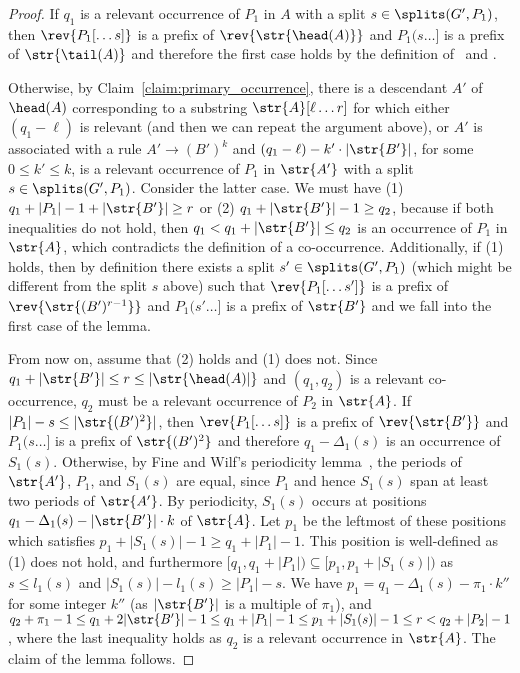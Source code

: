 \begin{proof}
If $q_1$ is a relevant occurrence of $P_1$ in $A$ with a split $s \in \splits(G', P_1)$, then $\rev{P_1[\dots s]}$ is a prefix of $\rev{\str{\head(A)}}$ and $P_1(s \dots ]$ is a prefix of $\str{\tail(A)}$ and therefore the first case holds by the definition of \Tpre\ and \Tsuf. 

Otherwise, by Claim~\ref{claim:primary_occurrence}, there is a descendant $A'$ of $\head(A)$ corresponding to a substring $\str{A}[\ell \dots r]$ for which either $(q_1-\ell)$ is relevant (and then we can repeat the argument above), or $A'$ is associated with a rule $A' \rightarrow (B')^k$ and $(q_1-\ell)-k' \cdot |\str{B'}|$, for some $0 \le k' \le k$, is a relevant occurrence of $P_1$ in $\str{A'}$ with a split $s \in \splits(G',P_1)$. Consider the latter case. We must have (1) $q_1+|P_1|-1+|\str{B'}| \ge r$ or (2) $q_1+|\str{B'}|-1 \ge q_2$, because if both inequalities do not hold, then $q_1 < q_1+|\str{B'}| \le q_2$ is an occurrence of $P_1$ in $\str{A}$, which contradicts the definition of a co-occurrence. Additionally, if (1) holds, then by definition there exists a split $s' \in \splits(G', P_1)$ (which might be different from the split $s$ above) such that $\rev{P_1[ \dots s']}$ is a prefix of $\rev{\str{(B')^{r-1}}}$ and $P_1(s' \dots ]$ is a prefix of $\str{B'}$ and we fall into the first case of the lemma. 

From now on, assume that (2) holds and (1) does not. Since $q_1+|\str{B'}| \le r \le |\str{\head(A)|}$ and $(q_1,q_2)$ is a relevant co-occurrence, $q_2$ must be a relevant occurrence of $P_2$ in $\str{A}$. If $|P_1|-s \le |\str{(B')^2}|$, then $\rev{P_1[ \dots s]}$ is a prefix of $\rev{\str{B'}}$ and $P_1(s \dots ]$ is a prefix of $\str{(B')^2}$ and therefore $q_1-\Delta_1(s)$ is an occurrence of $S_1(s)$. Otherwise, by Fine and Wilf's periodicity lemma~\cite{Fine1965}, the periods of $\str{A'}$, $P_1$, and $S_1(s)$ are equal, since $P_1$ and hence $S_1(s)$ span at least two periods of $\str{A'}$. By periodicity, $S_1(s)$ occurs at positions $q_1-\Delta_1(s)-|\str{B'}| \cdot k$ of $\str{A}$. Let $p_1$ be the leftmost of these positions which satisfies $p_1+|S_1(s)|-1 \ge q_1+|P_1|-1$. This position is well-defined as (1) does not hold, and furthermore $[q_1,q_1+|P_1|) \subseteq [p_1,p_1+|S_1(s)|)$ as $s \le l_1(s)$ and $|S_1(s)|-l_1(s) \ge |P_1|-s$. We have $p_1 = q_1-\Delta_1(s)-\pi_1 \cdot k''$ for some integer $k''$ (as $|\str{B'}|$ is a multiple of $\pi_1$), and 
$q_2 + \pi_1-1 \le q_1+2|\str{B'}|-1 \le q_1+|P_1|-1 \le p_1+|S_1(s)|-1 \le r < q_2+|P_2|-1$, 
where the last inequality holds as $q_2$ is a relevant occurrence in $\str{A}$. The claim of the lemma follows.
\end{proof}


